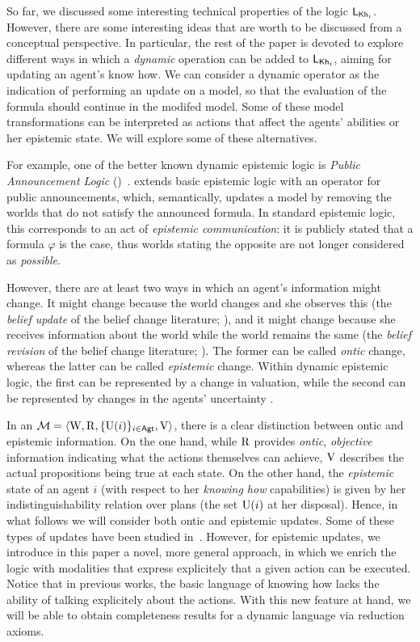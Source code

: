 So far, we discussed some interesting technical properties of the logic $\mathsf{L}_{{\sf Kh}_i}$. However, there are some interesting ideas that are worth to be discussed from a conceptual perspective. In particular, the rest of the paper is devoted to explore different ways in which a \emph{dynamic} operation can be added to $\mathsf{L}_{{\sf Kh}_i}$, aiming for updating an agent's know how.   We can consider a dynamic operator as the indication of performing an update on a model, so that the evaluation of the formula should continue in the modifed model.  Some of these model transformations can be interpreted as actions that affect the agents' abilities or her epistemic state. We will explore some of these alternatives.

For example, one of the better known dynamic epistemic logic is \emph{Public Announcement Logic} (\PAL)~\cite{Plaza89:lopc}.  \PAL extends basic epistemic logic with an operator for public announcements, which, semantically, updates a model by removing the worlds that do not satisfy the announced formula. In standard epistemic logic, this corresponds to an act of \emph{epistemic communication}: it is publicly stated that a formula $\varphi$ is the case, thus worlds stating the opposite are not longer considered as \emph{possible}.

However, there are at least two ways in which an agent's information might change. It might change because the world changes and she observes this (the \emph{belief update} of the belief change literature; \cite{sep-logic-belief-revision}), and it might change because she receives information about the world while the world remains the same (the \emph{belief revision} of the belief change literature; \cite{sep-logic-belief-revision}). The former can be called \emph{ontic} change, whereas the latter can be called \emph{epistemic} change. Within dynamic epistemic logic, the first can be represented by a change in valuation, while the second can be represented by changes in the agents' uncertainty \cite{vanDitmarschKooi2008}.

In an \ults $\mathcal{M}=\langle \operatorname{W},\operatorname{R},\{ \operatorname{U}(i) \}_{i\in{\rm \sf Agt}},\operatorname{V} \rangle$, there is a clear distinction between ontic and epistemic information. On the one hand, while $\operatorname{R}$ provides \emph{ontic}, \emph{objective} information indicating what the actions themselves can achieve, $\operatorname{V}$ describes the actual propositions being true at each state. On the other hand, the \emph{epistemic} state of an agent $i$ (with respect to her \emph{knowing how} capabilities) is given by her indistinguishability relation over plans (the set $\operatorname{U}(i)$ at her disposal). Hence, in what follows we will consider both ontic and epistemic updates. Some of these types of updates have been studied in~\cite{AFSV22}. However, for epistemic updates, we introduce in this paper a novel, more general approach, in which we enrich the logic with modalities that express explicitely that a given action can be executed. Notice that in previous works, the basic language of knowing how lacks the ability of talking explicitely about the actions. With this new feature at hand, we will be able to obtain completeness results for a dynamic language via reduction axioms.
